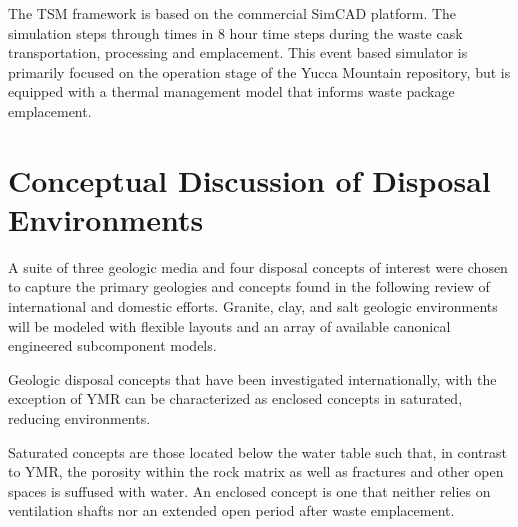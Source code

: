 The TSM framework is based on the commercial SimCAD platform. The simulation 
steps through times in 8 hour time steps during the waste cask transportation, 
processing and emplacement. This event based simulator is primarily focused on 
the operation stage of the Yucca Mountain repository, but is equipped with a 
thermal management model that informs waste package emplacement.

\section{Conceptual Discussion of Disposal Environments}





A suite of three geologic media and four disposal concepts of interest were
chosen to capture the primary geologies and concepts found in the following review 
of international and domestic efforts. Granite, clay, and salt geologic 
environments will be modeled with flexible layouts and an array of available 
canonical engineered subcomponent models.  

Geologic disposal concepts that have been investigated internationally, with the 
exception of \gls{YMR} can be characterized as enclosed concepts in saturated, 
reducing environments. 

Saturated concepts are those located below the water table such that, in contrast to 
\gls{YMR}, the porosity within the rock matrix as well as fractures 
and other open spaces is suffused with water. An enclosed concept is one that 
neither relies on ventilation shafts nor an extended open period after waste 
emplacement.

